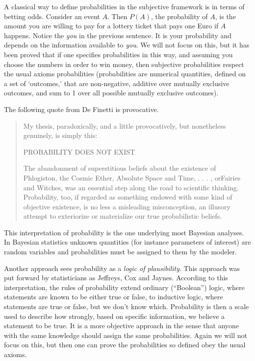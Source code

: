 \documentclass[
]{book}
\begin{document}
A classical way to define probabilities in the subjective framework is in terms of betting odds. Consider an event \(A\). Then \(P(A)\), the probability of \(A\), is the amount you are willing to pay for a lottery ticket that pays one Euro if \(A\) happens. Notice the \emph{you} in the previous sentence. It is your probability and depends on the information available to \emph{you}. We will not focus on this, but it has been proved that if one specifies probabilities in this way, and assuming you choose the numbers in order to win money, then subjective probabilities respect the usual axioms probabilities (probabilities are numerical quantities, defined
on a set of `outcomes,' that are non-negative, additive over mutually exclusive outcomes, and sum to 1 over all possible mutually exclusive outcomes).

The following quote from De Finetti is provocative.

\begin{quote}
My thesis, paradoxically, and a little provocatively, but nonetheless
genuinely, is simply this:

PROBABILITY DOES NOT EXIST

The abandonment of superstitious beliefs about the existence of Phlogiston, the Cosmic Ether, Absolute Space and Time, . . . , orFairies and Witches, was an essential step along the road to scientific thinking. Probability, too, if regarded as something endowed with some kind of objective existence, is no less a misleading misconception, an illusory attempt to exteriorize or materialize our true probabilistic beliefs.
\end{quote}

This interpretation of probability is the one underlying most Bayesian analyses. In Bayesian statistics unknown quantities (for instance parameters of interest) are random variables and probabilities must be assigned to them by the modeler.

Another approach sees probability as a \emph{logic of plausibility}. This approach was put forward by statisticians as Jeffreys, Cox and Jaynes. According to this interpretation, the rules of probability extend ordinary (``Boolean'') logic, where statements are known to be either true or false, to inductive logic, where statements are true or false, but we don't know which. Probability is then a scale used to describe how strongly, based on specific information, we believe a statement to be true. It is a more objective approach in the sense that anyone with the same knowledge should assign the same probabilities. Again we will not focus on this, but then one can prove the probabilities so defined obey the usual axioms.
\end{document}
